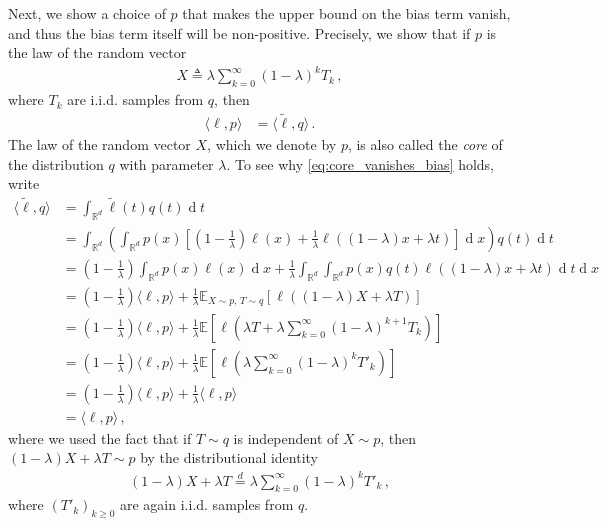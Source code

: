 \documentclass{article}
\theoremstyle{plain}
\theoremstyle{definition}
\theoremstyle{plain}
\newcommand{\Rd}{\mathbb{R}^d}
\newcommand{\E}{\mathbb E}
\renewcommand{\d}[1]{\operatorname{d}\!#1}
\begin{document}
Next, we show a choice of $p$ that makes the upper bound on the bias term vanish,
and thus the bias term itself will be non-positive.
Precisely, we show that if $p$ is the law of the random vector
\begin{align}
    X \triangleq \lambda \sum_{k=0}^\infty (1-\lambda)^k T_k\,,
\end{align}
where $T_k$ are i.i.d. samples from $q$, then
\begin{align}
    \langle \ell,p\rangle
     & =
    \langle \tilde{\ell},q\rangle\,.
    \label{eq:core_vanishes_bias}
\end{align}
The law of the random vector $X$, which we denote by $p$, is also called the \textit{core} of the distribution $q$ with parameter $\lambda$.
To see why \cref{eq:core_vanishes_bias} holds, write
\begin{align}
    \langle \tilde{\ell},q\rangle
     & =
    \int_{\Rd}
    \tilde{\ell}(t) q(t) \d t \\
     & =
    \int_{\Rd}
    \left(
    \int_{\Rd}
    p(x) \left[
        \left(1 - \frac{1}{\lambda}\right)\ell(x) + \frac{1}{\lambda} \ell\left((1-\lambda) x + \lambda t\right)
        \right] \d x
    \right)
    q(t) \d t                 \\
     & =
    \left(1 - \frac{1}{\lambda}\right)
    \int_{\Rd}
    p(x)
    \ell(x) \d x
    + \frac{1}{\lambda}
    \int_{\Rd}
    \int_{\Rd}
    p(x) q(t)
    \ell\left((1-\lambda) x + \lambda t\right)
    \d t \d x                 \\
     & =
    \left(1 - \frac{1}{\lambda}\right)
    \langle \ell,p\rangle
    +
    \frac{1}{\lambda}
    \E_{X\sim p,\,T\sim q}
    \left[
        \ell\left((1-\lambda)X+\lambda T\right)
    \right]                   \\
     & =
    \left(1 - \frac{1}{\lambda}\right)
    \langle \ell,p\rangle
    +
    \frac{1}{\lambda}
    \E
    \left[
        \ell
        \left(
        \lambda T+\lambda\sum_{k=0}^{\infty}(1-\lambda)^{k+1}T_k
        \right)
    \right]                   \\
     & =
    \left(1 - \frac{1}{\lambda}\right)
    \langle \ell,p\rangle
    +
    \frac{1}{\lambda}
    \E
    \left[
        \ell
        \left(
        \lambda\sum_{k=0}^{\infty}(1-\lambda)^k T'_k
        \right)
    \right]                   \\
     & =
    \left(1 - \frac{1}{\lambda}\right)
    \langle \ell,p\rangle
    +
    \frac{1}{\lambda}
    \langle \ell,p\rangle     \\
     & =
    \langle \ell,p\rangle\,,
\end{align}
where we used the fact that if $T\sim q$ is independent of
$X\sim p$, then $(1-\lambda)X+\lambda T\sim p$ by the distributional identity
\begin{align}
    (1-\lambda)X+\lambda T
    \stackrel{d}{=}
    \lambda\sum_{k=0}^{\infty}(1-\lambda)^k T'_k\,,
\end{align}
where $(T'_k)_{k\geq0}$ are again i.i.d. samples from $q$.
\end{document}
